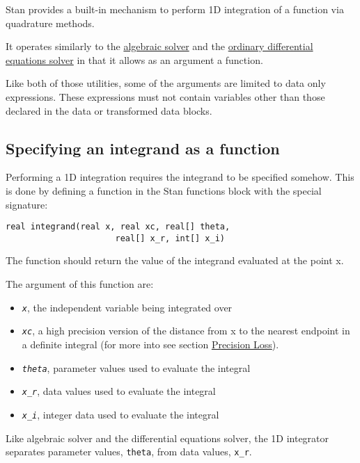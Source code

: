 \documentclass[
  10pt,
]{book}
\begin{document}
Stan provides a built-in mechanism to perform 1D integration of a function via quadrature methods.

It operates similarly to the \protect\hyperlink{functions-algebraic-solver}{algebraic solver} and
the \protect\hyperlink{functions-ode-solver}{ordinary differential equations solver} in that it allows as an argument a function.

Like both of those utilities, some of the arguments are limited
to data only expressions. These expressions must not contain variables
other than those declared in the data or transformed data blocks.

\hypertarget{specifying-an-integrand-as-a-function}{%
\subsection{Specifying an integrand as a function}\label{specifying-an-integrand-as-a-function}}

Performing a 1D integration requires the integrand to be specified somehow.
This is done by defining a function in the Stan functions block with the special signature:

\begin{verbatim}
real integrand(real x, real xc, real[] theta,
                      real[] x_r, int[] x_i)
\end{verbatim}

The function should return the value of the integrand evaluated at
the point x.

The argument of this function are:

\begin{itemize}
\item
  \emph{\texttt{x}}, the independent variable being integrated over
\item
  \emph{\texttt{xc}}, a high precision version of the distance from x to the nearest endpoint in a definite integral (for more into see section \protect\hyperlink{precision-loss}{Precision Loss}).
\item
  \emph{\texttt{theta}}, parameter values used to evaluate the integral
\item
  \emph{\texttt{x\_r}}, data values used to evaluate the integral
\item
  \emph{\texttt{x\_i}}, integer data used to evaluate the integral
\end{itemize}

Like algebraic solver and the differential equations solver, the 1D
integrator separates parameter values, \texttt{theta}, from data values, \texttt{x\_r}.
\end{document}
